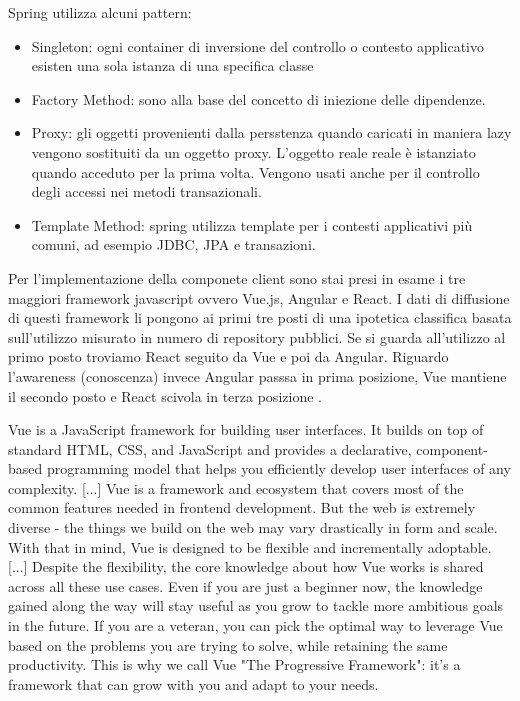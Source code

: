 \documentclass[a4paper,11pt]{article}
\begin{document}
Spring utilizza alcuni pattern:

\begin{itemize}
  \item Singleton: ogni container di inversione del controllo o contesto applicativo esisten una sola istanza di una specifica classe
  \item Factory Method: sono alla base del concetto di iniezione delle dipendenze.
  \item Proxy: gli oggetti provenienti dalla persstenza quando caricati in maniera lazy vengono sostituiti da un oggetto proxy. L'oggetto reale reale è istanziato quando acceduto per la prima volta. Vengono usati anche per il controllo degli accessi nei metodi transazionali.
  \item Template Method: spring utilizza template per i contesti applicativi più comuni, ad esempio JDBC, JPA e transazioni.
\end{itemize}

Per l'implementazione della componete client sono stai presi in esame i tre maggiori framework javascript ovvero Vue.js, Angular e React.
I dati di diffusione di questi framework li pongono ai primi tre posti di una ipotetica classifica basata sull'utilizzo misurato in numero di repository pubblici. Se si guarda all'utilizzo al primo posto troviamo React seguito da Vue e poi da Angular. Riguardo l'awareness (conoscenza) invece Angular passsa in prima posizione, Vue mantiene il secondo posto e React scivola in terza posizione \cite{stateofjsStateJavaScript}.

Vue is a JavaScript framework for building user interfaces. It builds on top of standard HTML, CSS, and JavaScript and provides a declarative, component-based programming model that helps you efficiently develop user interfaces of any complexity. [...] Vue is a framework and ecosystem that covers most of the common features needed in frontend development. But the web is extremely diverse - the things we build on the web may vary drastically in form and scale. With that in mind, Vue is designed to be flexible and incrementally adoptable. [...] Despite the flexibility, the core knowledge about how Vue works is shared across all these use cases. Even if you are just a beginner now, the knowledge gained along the way will stay useful as you grow to tackle more ambitious goals in the future. If you are a veteran, you can pick the optimal way to leverage Vue based on the problems you are trying to solve, while retaining the same productivity. This is why we call Vue "The Progressive Framework": it's a framework that can grow with you and adapt to your needs. \cite{vuejsVuejs}
\end{document}
